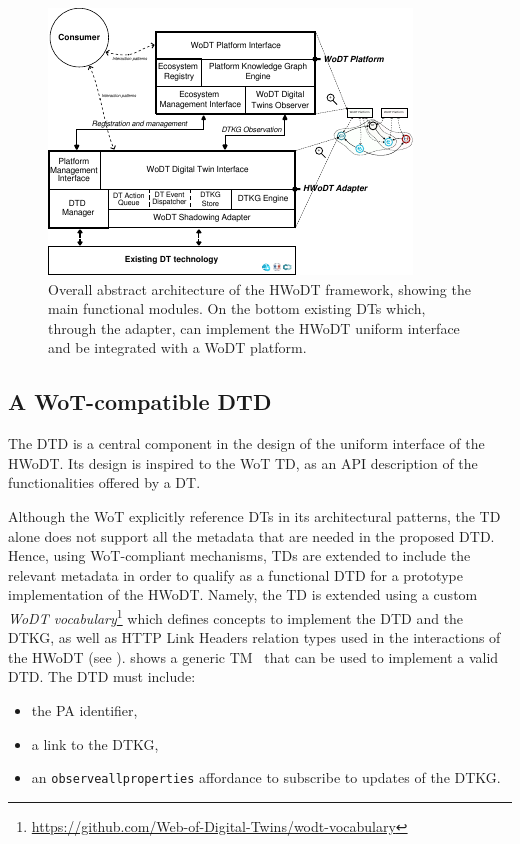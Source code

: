 \begin{figure}
  \centering
  \includegraphics[width=0.8\columnwidth]{figures/hwodt/abstract_arch.pdf}
  \caption{Overall abstract architecture of the \ac{HWoDT} framework, showing the main functional modules. On the bottom existing \acp{DT} which, through the adapter, can implement the \ac{HWoDT} uniform interface and be integrated with a \ac{WoDT} platform.}
  \label{fig:abstract_arch}
\end{figure}



\subsection{A WoT-compatible \acl{DTD}}

The \ac{DTD} is a central component in the design of the uniform interface of the \ac{HWoDT}.
%
Its design is inspired to the \ac{WoT} \ac{TD}, as an \ac{API} description of the functionalities offered by a \ac{DT}.

Although the \ac{WoT} explicitly reference \acp{DT} in its architectural patterns, the \ac{TD} alone does not support all the metadata that are needed in the proposed \ac{DTD}.
Hence, using \ac{WoT}-compliant mechanisms, \acp{TD} are extended to include the relevant metadata in order to qualify as a functional \ac{DTD} for a prototype implementation of the \ac{HWoDT}.
%
Namely, the \ac{TD} is extended using a custom \emph{\ac{WoDT} vocabulary}\footnote{\url{https://github.com/Web-of-Digital-Twins/wodt-vocabulary}}
which defines concepts to implement the \ac{DTD} and the \ac{DTKG}, as well as HTTP Link Headers relation types used in the interactions of the \ac{HWoDT} (see ).
%
 shows a generic \ac{TM}~\cite{wot-td} that can be used to implement a valid \ac{DTD}. The \ac{DTD} must include:
\begin{itemize}
    \item the \ac{PA} identifier, 
    \item a link to the \ac{DTKG},
    \item an \texttt{observeallproperties} affordance to subscribe to updates of the \ac{DTKG}.
\end{itemize}

